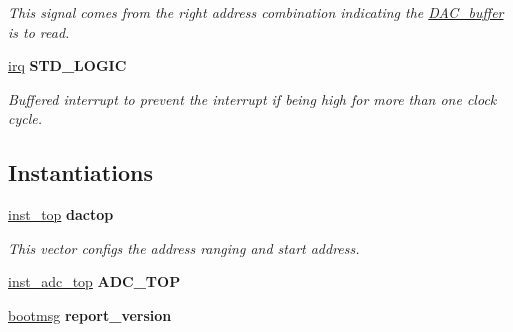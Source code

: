 \begin{DoxyCompactItemize}
\begin{DoxyCompactList}\small\item\em This signal comes from the right address combination indicating the \hyperlink{classDAC__buffer}{D\-A\-C\-\_\-buffer} is to read. \end{DoxyCompactList}\item 
\hypertarget{classdummyapb_1_1APB__interface_a769f70cbb5f735c15f487c59ff05b292}{\hyperlink{classdummyapb_1_1APB__interface_a769f70cbb5f735c15f487c59ff05b292}{irq} {\bfseries \textcolor{comment}{S\-T\-D\-\_\-\-L\-O\-G\-I\-C}\textcolor{vhdlchar}{ }} }\label{classdummyapb_1_1APB__interface_a769f70cbb5f735c15f487c59ff05b292}

\begin{DoxyCompactList}\small\item\em Buffered interrupt to prevent the interrupt if being high for more than one clock cycle. \end{DoxyCompactList}\end{DoxyCompactItemize}
\subsection*{Instantiations}
 \begin{DoxyCompactItemize}
\item 
\hypertarget{classdummyapb_1_1APB__interface_af8047950a8cbc047aafda26366d23dcd}{\hyperlink{classdummyapb_1_1APB__interface_af8047950a8cbc047aafda26366d23dcd}{inst\-\_\-top}  {\bfseries dactop}   }\label{classdummyapb_1_1APB__interface_af8047950a8cbc047aafda26366d23dcd}

\begin{DoxyCompactList}\small\item\em This vector configs the address ranging and start address. \end{DoxyCompactList}\item 
\hypertarget{classdummyapb_1_1APB__interface_af3a42d0acd19aeab2e861d729423303a}{\hyperlink{classdummyapb_1_1APB__interface_af3a42d0acd19aeab2e861d729423303a}{inst\-\_\-adc\-\_\-top}  {\bfseries A\-D\-C\-\_\-\-T\-O\-P}   }\label{classdummyapb_1_1APB__interface_af3a42d0acd19aeab2e861d729423303a}

\item 
\hypertarget{classdummyapb_1_1APB__interface_acc6b2c6c9f85f90e08b01fb364af1a87}{\hyperlink{classdummyapb_1_1APB__interface_acc6b2c6c9f85f90e08b01fb364af1a87}{bootmsg}  {\bfseries report\-\_\-version}   }\label{classdummyapb_1_1APB__interface_acc6b2c6c9f85f90e08b01fb364af1a87}

\end{DoxyCompactItemize}


